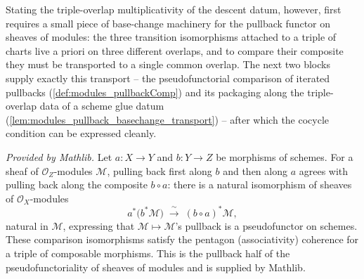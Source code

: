 Stating the triple-overlap multiplicativity of the descent datum, however, first
requires a small piece of base-change machinery for the pullback functor on sheaves
of modules: the three transition isomorphisms attached to a triple of charts live a
priori on three different overlaps, and to compare their composite they must be
transported to a single common overlap. The next two blocks supply exactly this
transport -- the pseudofunctorial comparison of iterated pullbacks
(\cref{def:modules_pullbackComp}) and its packaging along the triple-overlap data of a
scheme glue datum (\cref{lem:modules_pullback_basechange_transport}) -- after which the
cocycle condition can be expressed cleanly.

\begin{definition}
  \label{def:modules_pullbackComp}
  \mathlibok
  \textit{Provided by Mathlib.}
  Let \(a : X \to Y\) and \(b : Y \to Z\) be morphisms of schemes. For a sheaf of
  \(\mathcal{O}_Z\)-modules \(\mathcal{M}\), pulling back first along \(b\) and then
  along \(a\) agrees with pulling back along the composite \(b \circ a\): there is a
  natural isomorphism of sheaves of \(\mathcal{O}_X\)-modules
  \[
    a^{*}\bigl(b^{*}\mathcal{M}\bigr)
      \;\xrightarrow{\ \sim\ }\;
    (b \circ a)^{*}\mathcal{M},
  \]
  natural in \(\mathcal{M}\), expressing that \(\mathcal{M} \mapsto \mathcal{M}\)'s
  pullback is a pseudofunctor on schemes. These comparison isomorphisms satisfy the
  pentagon (associativity) coherence for a triple of composable morphisms. This is the
  pullback half of the pseudofunctoriality of sheaves of modules and is supplied by
  Mathlib.
\end{definition}

